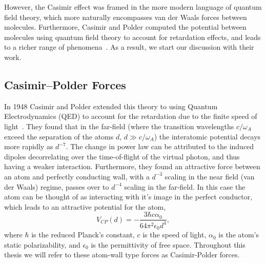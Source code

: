 However, the Casimir effect was framed in the more modern language of quantum field theory, 
which more naturally encompasses van der Waals forces between molecules.  
Furthermore, Casimir and Polder computed the potential between molecules 
using quantum field theory to account for retardation effects, and leads to a richer range of phenomena~\cite{CasimirPolder1948}.  
As a result, we start our discussion with their work.  

\subsection{Casimir--Polder Forces}

In 1948 Casimir and Polder extended this theory to using Quantum Electrodynamics
(QED) to account for the retardation due to the finite speed of light~\cite{CasimirPolder1948}. 
They found that in the far-field 
(where the transition wavelengths $c/\omega_A$ exceed the separation of the atoms $d$, $d\gg c/\omega_A$)
the interatomic potential decays more rapidly as $d^{-7}$.  The change in power law can be 
attributed to the induced dipoles decorrelating over the time-of-flight of the virtual photon, 
and thus having a weaker interaction.  
Furthermore, they found an attractive force between an atom and perfectly conducting wall, with a $d^{-3}$ scaling
in the near field (van der Waals) regime, passes over to $d^{-4}$ scaling in the far-field.
In this case the atom can be thought of as interacting with it's image in the perfect conductor,   
which leads to an attractive potential for the atom,
\begin{equation}
  V_{CP}(d) =-\frac{3\hbar c\alpha_0}{64\pi^2\epsilon_0 d^4},
\end{equation}
where $\hbar$ is the reduced Planck's constant, $c$ is the speed of light, $\alpha_0$ is the atom's static polarizability,
and $\epsilon_0$ is the permittivity of free space.  Throughout this thesis we will refer to these
atom-wall type forces as Casimir-Polder forces.  

